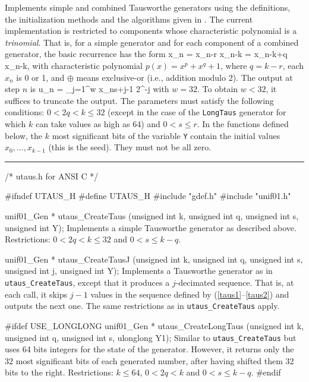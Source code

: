 
Implements simple and combined Tausworthe generators using
the definitions, the initialization methods and the
 algorithms given in \cite{rLEC94a,rLEC96a}.
The current implementation is restricted to components whose 
characteristic polynomial is a {\em trinomial}.  That is,
for a  simple generator and for each component of a combined
generator, the basic recurrence has the form %
\eq                                               {}
  x_n = x_{n-r} \oplus x_{n-k} = x_{n-k+q} \oplus x_{n-k},
\endeq
with characteristic polynomial $p(x) = x^p + x^q + 1$,
where $q = k-r$, each $x_n$ is 0 or 1, and $\oplus$ 
means exclusive-or (i.e., addition modulo 2).
The output at step $n$ is
\eq                                               {}
  u_n = \sum_{j=1}^w x_{ns+j-1} 2^{-j}
\endeq
with $w = 32$. 
To obtain $w < 32$, it suffices to truncate the output.
The parameters must satisfy the following conditions:
$0 < 2q < k \le 32$ (except in the case of the {\tt LongTaus} generator
for which $k$ can take values as high as 64) and $0 < s \le r$.
In the functions defined below, the $k$ most significant 
bits of the variable {\tt Y} contain 
the initial values  $x_0,\dots,x_{k-1}$ (this is the seed).
They must not be all zero.

\bigskip
\hrule
\code
\hide
/* utaus.h for ANSI C */

#ifndef UTAUS_H
#define UTAUS_H
\endhide
#include "gdef.h"
#include "unif01.h"


unif01_Gen * utaus_CreateTaus (unsigned int k, unsigned int q,
                               unsigned int s, unsigned int Y);
\endcode        
  \tab  Implements a simple Tausworthe generator as described above.
   Restrictions: $0 < 2q < k \le 32$ and $0 < s \le k-q$.
  \endtab
\code


unif01_Gen * utaus_CreateTausJ (unsigned int k, unsigned int q,
                                unsigned int s, unsigned int j,
                                unsigned int Y);
\endcode
  \tab  Implements a Tausworthe generator as in {\tt utaus\_CreateTaus},
   except that it produces a $j$-decimated sequence.
   That is, at each call, it skips $j-1$ values in the sequence 
   defined by (\ref{taus1}--\ref{taus2}) and outputs the next one.
   The same restrictions as in {\tt utaus\_CreateTaus} apply.
  \endtab
\code


#ifdef USE_LONGLONG
   unif01_Gen * utaus_CreateLongTaus (unsigned int k, unsigned int q,
                                      unsigned int s, ulonglong Y1);
\endcode
  \tab    Similar to {\tt utaus\_CreateTaus} but uses
   64 bits integers for the state of the generator. However, it returns
   only the 32 most significant bits of each  generated number, after
   having shifted them 32 bits to the right. 
   Restrictions: $k \le 64$, $0 < 2q < k$ and $0 < s \le k-q$.
  \endtab
\code
#endif


